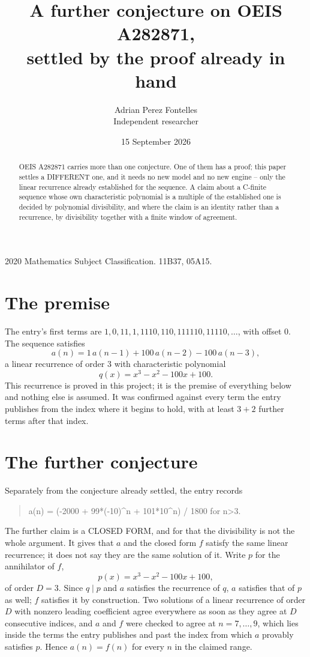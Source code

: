 \documentclass[11pt,a4paper]{article}
\title{A further conjecture on OEIS A282871,\\ \large settled by the proof already in hand}
\author{Adrian Perez Fontelles\\ \small Independent researcher}
\date{15 September 2026}
\theoremstyle{plain}
\theoremstyle{definition}
\begin{document}
\maketitle

\begin{abstract}
OEIS A282871 carries more than one conjecture. One of them has a proof; this paper settles a
DIFFERENT one, and it needs no new model and no new engine -- only the linear recurrence already
established for the sequence. A claim about a C-finite sequence whose own characteristic
polynomial is a multiple of the established one is decided by polynomial divisibility, and where
the claim is an identity rather than a recurrence, by divisibility together with a finite window
of agreement.
\end{abstract}

\noindent\small 2020 Mathematics Subject Classification. 11B37, 05A15.\normalsize

\section{The premise}

The entry's first terms are $1, 0, 11, 1, 1110, 110, 111110, 11110,\dots$, with offset $0$. The sequence satisfies
\[
  a(n)=1\,a(n-1) + 100\,a(n-2) - 100\,a(n-3) ,
\]
a linear recurrence of order $3$ with characteristic polynomial
\[
  q(x)=x^{3} - x^{2} - 100 x + 100 .
\]
This recurrence is proved in this project; it is the premise of everything below and nothing else is assumed.
It was confirmed against every term the entry publishes from the index where it begins to hold,
with at least $3+2$ further terms after that index.

\section{The further conjecture}

Separately from the conjecture already settled, the entry records

\begin{quote}\raggedright a(n) = (-2000 + 99*(-10)\^{}n + 101*10\^{}n) / 1800 for n>3.\end{quote}

The further claim is a CLOSED FORM, and for that the divisibility is not the whole argument. It
gives that $a$ and the closed form $f$ satisfy the same linear recurrence; it does not say they
are the same solution of it. Write $p$ for the annihilator of $f$,
\[
  p(x)=x^{3} - x^{2} - 100 x + 100 ,
\]
of order $D=3$. Since $q\mid p$ and $a$ satisfies the recurrence of $q$, $a$ satisfies that of
$p$ as well; $f$ satisfies it by construction. Two solutions of a linear recurrence of order $D$
with nonzero leading coefficient agree everywhere as soon as they agree at $D$ consecutive
indices, and $a$ and $f$ were checked to agree at $n=7,\dots,9$,
which lies inside the terms the entry publishes and past the index from which $a$ provably
satisfies $p$. Hence $a(n)=f(n)$ for every $n$ in the claimed range.
\end{document}
